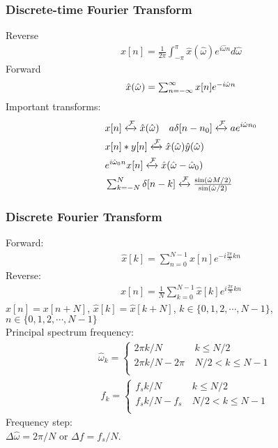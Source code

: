 \documentclass[6pt,landscape,a4paper]{article}
\begin{document}
\begin{multicols*}{5}
\subsubsection*{Discrete-time Fourier Transform}
Reverse
\vspace{-1em}
\begin{align*}
x[n]=\frac{1}{2\pi}\textstyle\int_{-\pi}^{\pi}\hat{x}(\hat{\omega})e^{i\hat{\omega}n}d\hat{\omega}
\end{align*}
Forward
\vspace{-1em}
\begin{align*}
\hat{x}(\hat{\omega})=\textstyle\textstyle\sum_{n=-\infty}^{\infty} x[n] e^{-i\hat{\omega} n}
\end{align*}
Important transforms:
\begin{align*}
&x[n]  \xleftrightarrow{\mathcal{F}} \hat{x}(\hat{\omega}) \hspace{1em} a \delta[n-n_0] \xleftrightarrow{\mathcal{F}} a e^{i\hat{\omega}n_0}  \\
&x[n]*y[n] \xleftrightarrow{\mathcal{F}} \hat{x}(\hat{\omega})\hat{y}(\hat{\omega}) \\ &e^{i\hat{\omega}_0 n}x[n] \xleftrightarrow{\mathcal{F}} \hat{x}(\hat{\omega} - \hat{\omega}_0)\\
&\textstyle\sum_{k=-N}^{N} \delta[n-k] \xleftrightarrow{\mathcal{F}} \frac{\sin(\hat{\omega}M/2)}{\sin(\hat{\omega}/2)}
\end{align*}
\subsubsection*{Discrete Fourier Transform}
Forward:
\begin{align*}
\hat{x}[k] = \textstyle\sum_{n=0}^{N-1}x[n]e^{-i\frac{2\pi}{N}kn}
\end{align*}
Reverse:
\vspace{-1em}
\begin{align*}
x[n] = \frac{1}{N}\textstyle\sum_{k=0}^{N-1}\hat{x}[k]e^{i\frac{2\pi}{N}kn}
\end{align*}
$x[n]=x[n+N]$, $\hat{x}[k]=\hat{x}[k+N]$, $k\in \{0,1,2,\cdots,N-1\}$, $n\in \{0,1,2,\cdots,N-1\}$\\
Principal spectrum frequency:
\begin{align*}
&  \hat{\omega}_k = \left\{\begin{array}{cl}
    2\pi k/N & ~  k \le N/2   \\
    2\pi k/N - 2\pi & ~  N/2 < k \le N-1 \\
  \end{array}
  \right.
\end{align*}
\begin{align*}
&  f_k = \left\{\begin{array}{cl}
    f_s k/N & ~  k \le N/2   \\
    f_s k/N - f_s & ~  N/2 < k \le N-1 \\
  \end{array}
  \right.
\end{align*}
\fi
Frequency step: \\
$\Delta{\hat{\omega}}=2\pi/N$ or $\Delta f = f_s/N$.


\end{multicols*}
\end{document}
